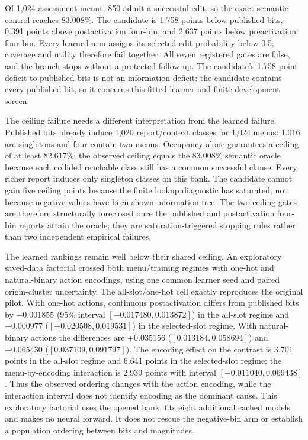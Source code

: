 \documentclass[
  british,
  11pt,
  a4paper,
]{article}
\begin{document}
Of 1,024 assessment menus, 850 admit a successful edit, so the exact
semantic control reaches 83.008\%. The candidate is 1.758 points below
published bits, 0.391 points above postactivation four-bin, and 2.637
points below preactivation four-bin. Every learned arm assigns its
selected edit probability below 0.5; coverage and utility therefore fail
together. All seven registered gates are false, and the branch stops
without a protected follow-up. The candidate's 1.758-point deficit to
published bits is not an information deficit: the candidate contains
every published bit, so it concerns this fitted learner and finite
development screen.

The ceiling failure needs a different interpretation from the learned
failure. Published bits already induce 1,020 report/context classes for
1,024 menus: 1,016 are singletons and four contain two menus. Occupancy
alone guarantees a ceiling of at least 82.617\%; the observed ceiling
equals the 83.008\% semantic oracle because each collided reachable
class still has a common successful clause. Every richer report induces
only singleton classes on this bank. The candidate cannot gain five
ceiling points because the finite lookup diagnostic has saturated, not
because negative values have been shown information-free. The two
ceiling gates are therefore structurally foreclosed once the published
and postactivation four-bin reports attain the oracle; they are
saturation-triggered stopping rules rather than two independent
empirical failures.

The learned rankings remain well below their shared ceiling. An
exploratory saved-data factorial crossed both menu/training regimes with
one-hot and natural-binary action encodings, using one common learner
seed and paired origin-cluster uncertainty. The all-slot/one-hot cell
exactly reproduces the original pilot. With one-hot actions, continuous
postactivation differs from published bits by \(-0.001855\) (95\%
interval \([-0.017480,0.013872]\)) in the all-slot regime and
\(-0.000977\) (\([-0.020508,0.019531]\)) in the selected-slot regime.
With natural-binary actions the differences are \(+0.035156\)
(\([0.013184,0.058694]\)) and \(+0.065430\) (\([0.037109,0.091797]\)).
The encoding effect on the contrast is 3.701 points in the all-slot
regime and 6.641 points in the selected-slot regime; the
menu-by-encoding interaction is 2.939 points with interval
\([-0.011040,0.069438]\). Thus the observed ordering changes with the
action encoding, while the interaction interval does not identify
encoding as the dominant cause. This exploratory factorial uses the
opened bank, fits eight additional cached models and makes no neural
forward. It does not rescue the negative-bin arm or establish a
population ordering between bits and magnitudes.
\end{document}
